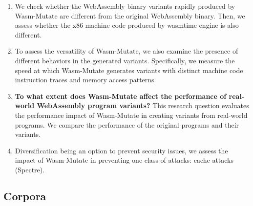 \documentclass[a4paper,fleqn]{cas-dc}
\newcommand{\tool}{{\sc Wasm-Mutate}\xspace}
\newcommand{\Wasm}{WebAssembly\xspace}
\newcommand{\wasm}{\Wasm}
\newenvironment{revision1}{\color{blue}}{}
\begin{document}
\newcommand\rqperformance{To what extent does \tool affect the performance of real-world \Wasm program variants?\xspace}


\newcommand\rqtesting{To what extent can \tool be used to perform differential testing of \Wasm tools?\xspace}

\newcommand{\nProgramsRosetta}{303\xspace}


\newcommand{\DTWStatic}{\ensuremath{\mathit{dt\_static}\xspace}}
\newcommand{\DTWDynamic}{\ensuremath{\mathit{dt\_dy}\xspace}}

\begin{enumerate}[label=RQ\arabic*:, ref=RQ\arabic*]
     \item \label{rq:static} \textbf{\rqstatic}
        We check whether the \wasm binary variants rapidly produced by \tool are different from the original \wasm binary. Then, we assess whether the x86 machine code produced by wasmtime engine is also different.
    
    \item \label{rq:dynamic}\textbf{\rqdynamic}
    To assess the versatility of \tool, we also examine the presence of different behaviors in the generated variants. 
    Specifically, we measure the speed at which \tool generates variants with distinct machine code instruction traces and memory access patterns.
    
        

     \begin{revision1}
        \item \label{rq:performance}\textbf{\rqperformance} This research question evaluates the performance impact of \tool in creating variants from real-world programs. We compare the performance of the original programs and their variants.
     \end{revision1}
     
    \item \label{rq:defensive}\textbf{\rqdefensive} Diversification being an option to prevent security issues,  we assess the impact of \tool in preventing one class of attacks: cache attacks (Spectre).

        
\end{enumerate}


\subsection{Corpora}
\label{sec:corpus}
\end{document}
